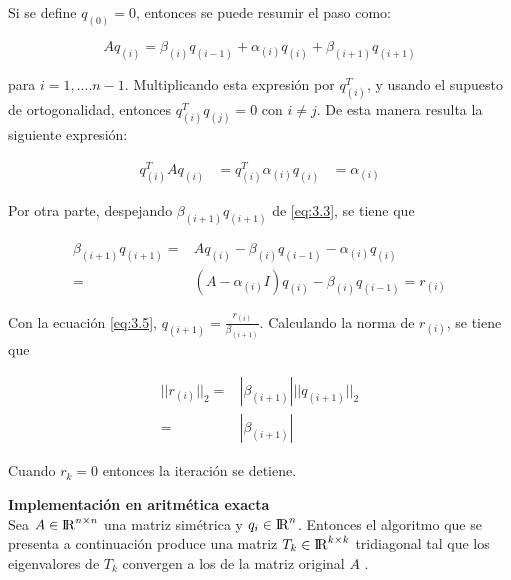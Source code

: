 Si se define $q_{(0)} = 0$, entonces se puede resumir el paso como:

\begin{equation}\label{eq:3.3}
  Aq_{(i)} = \beta_{(i)} q_{(i-1)} + \alpha_{(i)} q_{(i)}+ \beta_{(i+1)} q_{(i+1)}
\end{equation}

para $i = 1, .... n-1$. Multiplicando esta expresión por $q_{(i)}^T$, y usando el supuesto de ortogonalidad, entonces $q_{(i)}^T q_{(j)} = 0$ con $i \neq j$. De esta manera resulta la siguiente expresión:

\begin{equation}\label{eq:3.4}
\begin{aligned}
  q_{(i)}^TAq_{(i)} &=  q_{(i)}^T\alpha_{(i)} q_{(i)}  
                    &= \alpha_{(i)}
\end{aligned}
\end{equation}

Por otra parte, despejando $\beta_{(i+1)} q_{(i+1)}$ de \ref{eq:3.3}, se tiene que

\begin{equation}\label{eq:3.5}
\begin{aligned}
\beta_{(i+1)} q_{(i+1)}  =& Aq_{(i)} - \beta_{(i)} q_{(i-1)} - \alpha_{(i)} q_{(i)} \\ 
=& (A - \alpha_{(i)} I) q_{(i)} - \beta_{(i)} q_{(i-1)} = r_{(i)}
\end{aligned}
\end{equation}

Con la ecuación \ref{eq:3.5}, $q_{(i+1)} = \frac{r_{(i)}}{\beta_{(i+1)}}$. Calculando la norma de $r_{(i)}$, se tiene que 

\begin{equation}\label{eq:3.6}
\begin{aligned}
||r_{(i)}||_2 =& |\beta_{(i+1)}| ||q_{(i+1)}||_2 \\
              =& |\beta_{(i+1)}|
\end{aligned}
\end{equation}
 
Cuando $r_k =0$ entonces la iteración se detiene. \cite{golub2012matrix}

\pagebreak

\textbf{Implementación en aritmética exacta}\\

Sea $ A \in {\rm I\!R}^{n \times n}$ una matriz simétrica y $q_i \in {\rm I\!R}^{n}$. Entonces el algoritmo que se presenta a continuación produce una matriz $T_k \in {\rm I\!R}^{k \times k}$ tridiagonal tal que los eigenvalores de $T_k$ convergen a los de la matriz original $A$ \cite{golub2012matrix}. 

